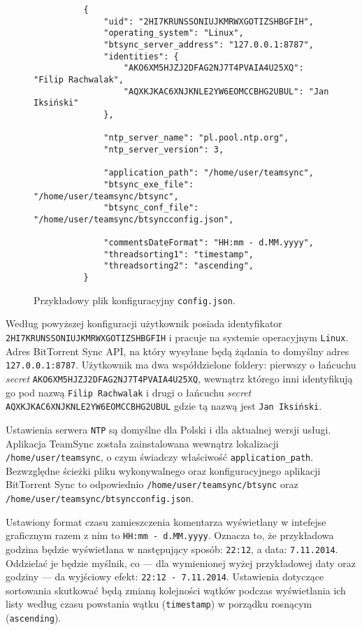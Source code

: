 \begin{figure}[htb]
  \begin{verbatim}
          {
              "uid": "2HI7KRUNSSONIUJKMRWXGOTIZSHBGFIH",
              "operating_system": "Linux", 
              "btsync_server_address": "127.0.0.1:8787", 
              "identities": {
                  "AKO6XM5HJZJ2DFAG2NJ7T4PVAIA4U25XQ": "Filip Rachwalak", 
                  "AQXKJKAC6XNJKNLE2YW6EOMCCBHG2UBUL": "Jan Iksiński"
              }, 
    
              "ntp_server_name": "pl.pool.ntp.org", 
              "ntp_server_version": 3, 

              "application_path": "/home/user/teamsync",           
              "btsync_exe_file": "/home/user/teamsync/btsync",
              "btsync_conf_file": "/home/user/teamsync/btsyncconfig.json",

              "commentsDateFormat": "HH:mm - d.MM.yyyy", 
              "threadsorting1": "timestamp", 
              "threadsorting2": "ascending", 
          }
  \end{verbatim}
  \caption{Przykładowy plik konfiguracyjny \texttt{config.json}.}
\end{figure}

Według powyższej konfiguracji użytkownik posiada identyfikator \texttt{2HI7KRUN\-SSONIUJKM\-RWXGOTIZ\-SHBGFIH} i pracuje na systemie operacyjnym \texttt{Linux}. Adres BitTorrent Sync API, na który wysyłane będą żądania to domyślny adres \texttt{127.0.0.1:8787}. Użytkownik ma dwa współdzielone foldery: pierwszy o łańcuchu \emph{secret} \texttt{AKO6XM5H\-JZJ2DFAG2\-NJ7T4PVAI\-A4U25XQ}, wewnątrz którego inni identyfikują go pod nazwą \texttt{Filip \-Rachwalak} i drugi o łańcuchu \emph{secret} \texttt{AQXKJKAC\-6XNJKNLE2\-YW6EOMCC\-BHG2UBUL} gdzie tą nazwą jest \texttt{Jan \-Iksiński}.

Ustawienia serwera \texttt{NTP} są domyślne dla Polski i dla aktualnej wersji usługi. Aplikacja TeamSync została zainstalowana wewnątrz lokalizacji \texttt{/home\-/user\-/teamsync}, o czym świadczy właściwość \texttt{application\_\-path}. Bezwzględne ścieżki pliku wykonywalnego oraz konfiguracyjnego aplikacji BitTorrent Sync to odpowiednio \texttt{/home/user/\-teamsync/btsync} oraz \texttt{/home/user/\-teamsync/\-btsyncconfig.json}.

Ustawiony format czasu zamieszczenia komentarza wyświetlany w intefejse graficznym razem z nim to \texttt{HH:mm - d.MM.yyyy}. Oznacza to, że przykładowa godzina będzie wyświetlana w następujący sposób: \texttt{22:12}, a data: \texttt{7.11.2014}. Oddzielać je będzie myślnik, co --- dla wymienionej wyżej przykładowej daty oraz godziny --- da wyjściowy efekt: \texttt{22:12 - 7.11.2014}. Ustawienia dotyczące sortowania skutkować będą zmianą kolejności wątków podczas wyświetlania ich listy według czasu powstania wątku (\texttt{timestamp}) w porządku rosnącym (\texttt{ascending}).

